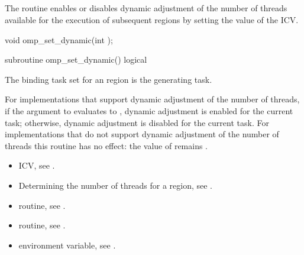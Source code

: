 \bigskip
\subsection{}
\label{subsec:omp_set_dynamic}
\summary
The  routine enables or disables dynamic adjustment of the 
number of threads available for the execution of subsequent  regions by 
setting the value of the  ICV.


\pagebreak
\format
\ccppspecificstart
\begin{boxedcode}
void omp\_set\_dynamic(int );
\end{boxedcode}
\ccppspecificend
\bigskip

\begin{samepage}
\fortranspecificstart
\begin{boxedcode}
subroutine omp\_set\_dynamic()
logical 
\end{boxedcode}
\fortranspecificend
\end{samepage}

\binding
The binding task set for an  region is the generating task. 

\effect
For implementations that support dynamic adjustment of the number of threads, if the 
argument to  evaluates to , dynamic adjustment is enabled for 
the current task; otherwise, dynamic adjustment is disabled for the current task. For 
implementations that do not support dynamic adjustment of the number of threads this 
routine has no effect: the value of  remains .

\crossreferences
\begin{itemize}
\item {} ICV, see 
.

\item Determining the number of threads for a  region, see
. 

\item {} routine, see 
.

\item {} routine, see 
.

\item {} environment variable, see 
.
\end{itemize}









